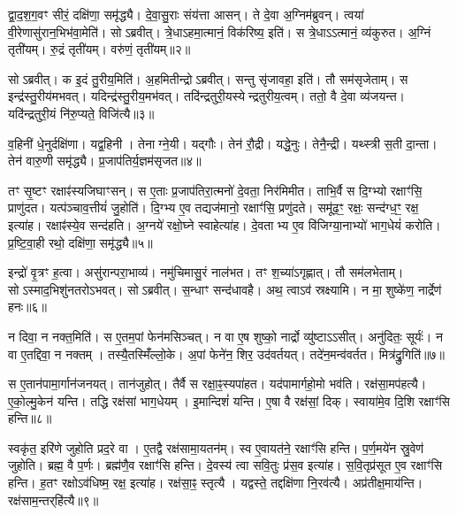 द्वा॒द॒श॒ग॒वꣳ सीरं॒ दक्षि॑णा॒ समृ॑द्ध्यै।
दे॒वा॒सु॒राः संय॑त्ता आसन्।
ते दे॒वा अ॒ग्निम॑ब्रुवन्।
त्वया॑ वी॒रेणासु॑रान॒भिभ॑वा॒मेति॑।
सोऽब्रवीत्।
त्रे॒धा\-ऽहमा॒त्मानं॒ विक॑रिष्य॒ इति॑।
स त्रे॒धा\-ऽऽत्मानं॒ व्य॑कुरुत।
अ॒ग्निं तृती॑यम्।
रु॒द्रं तृती॑यम्।
वरु॑णं॒ तृती॑यम्॥२॥

सोऽब्रवीत्।
क इ॒दं तु॒रीय॒मिति॑।
अ॒हमितीन्द्रो\-ऽब्रवीत्।
सन्तु सृ॑जावहा॒ इति॑।
तौ सम॑सृजेताम्।
स इन्द्र॑स्तु॒रीय॑मभवत्।
यदिन्द्र॑स्तु॒रीय॒मभ॑वत्।
तदि॑न्द्रतुरी॒यस्येन्द्रतुरीय॒त्वम्।
ततो॒ वै दे॒वा व्य॑जयन्त।
यदि॑न्द्रतुरी॒यं नि॑रु॒प्यते॒ विजि॑त्यै॥३॥

व॒हिनी॑ धे॒नुर्दक्षि॑णा।
यद्व॒हिनी।
तेनाग्ने॒यी।
यद्गौः।
तेन॑ रौ॒द्री।
यद्धे॒नुः।
तेनै॒न्द्री।
यथ्स्त्री स॒ती दा॒न्ता।
तेन॑ वारु॒णी समृ॑द्ध्यै।
प्र॒जाप॑तिर्य॒ज्ञम॑सृजत॥४॥

तꣳ सृ॒ष्टꣳ रक्षाꣴ॑स्यजिघाꣳसन्।
स ए॒ताः प्र॒जाप॑तिरा॒त्मनो॑ दे॒वता॒ निर॑मिमीत।
ताभि॒र्वै स दि॒ग्भ्यो रक्षाꣳ॑सि॒ प्राणु॑दत।
यत्प॑ञ्चाव॒त्तीयं॑ जु॒होति॑।
दि॒ग्भ्य ए॒व तद्यज॑मानो॒ रक्षाꣳ॑सि॒ प्रणु॑दते।
समू॑ढ॒ꣳ॒ रक्षः॒ सन्द॑ग्ध॒ꣳ॒ रक्ष॒ इत्या॑ह।
रक्षाꣴ॑स्ये॒व सन्द॑हति।
अ॒ग्नये॑ रक्षो॒घ्ने स्वाहेत्या॑ह।
दे॒वताभ्य ए॒व वि॑जिग्या॒नाभ्यो॑ भाग॒धेयं॑ करोति।
प्र॒ष्टि॒वा॒ही रथो॒ दक्षि॑णा॒ समृ॑द्ध्यै॥५॥

इन्द्रो॑ वृ॒त्रꣳ ह॒त्वा।
असु॑रान्परा॒भाव्य॑।
नमु॑चिमासु॒रं नाल॑भत।
तꣳ श॒च्या॑\-ऽगृह्णात्।
तौ सम॑लभेताम्।
सोऽस्माद॒भिशु॑नतरो\-ऽभवत्।
सोऽब्रवीत्।
स॒न्धाꣳ सन्द॑धावहै।
अथ॒ त्वाऽव॑ स्रक्ष्यामि।
न मा॒ शुष्के॑ण॒ नार्द्रेण॑ हनः॥६॥

न दिवा॒ न नक्त॒मिति॑।
स ए॒तम॒पां फेन॑मसिञ्चत्।
न वा ए॒ष शुष्को॒ नार्द्रो व्यु॑ष्टा\-ऽऽसीत्।
अनु॑दितः॒ सूर्यः॑।
न वा ए॒तद्दिवा॒ न नक्तम्।
तस्यै॒तस्मिँ॑ल्लो॒के।
अ॒पां फेने॑न॒ शिर॒ उद॑वर्तयत्।
तदे॑न॒मन्व॑वर्तत।
मित्र॑द्रु॒गिति॑॥७॥

स ए॒तान॑पामा॒र्गान॑जनयत्।
तान॑जुहोत्।
तैर्वै स रक्षा॒ꣴ॒स्यपा॑हत।
यद॑पामार्गहो॒मो भव॑ति।
रक्ष॑सा॒मप॑हत्यै।
ए॒को॒ल्मु॒केन॑ यन्ति।
तद्धि रक्ष॑सां भाग॒धेयम्।
इ॒मान्दिशं॑ यन्ति।
ए॒षा वै रक्ष॑सां॒ दिक्।
स्वाया॑मे॒व दि॒शि रक्षाꣳ॑सि हन्ति॥८॥

स्वकृ॑त॒ इरि॑णे जुहोति प्रद॒रे वा।
ए॒तद्वै रक्ष॑सामा॒यतन॑म्।
स्व ए॒वायत॑ने॒ रक्षाꣳ॑सि हन्ति।
प॒र्ण॒मये॑न स्रु॒वेण॑ जुहोति।
ब्रह्म॒ वै प॒र्णः।
ब्रह्म॑णै॒व रक्षाꣳ॑सि हन्ति।
दे॒वस्य॑ त्वा सवि॒तुः प्र॑स॒व इत्या॑ह।
स॒वि॒तृप्र॑सूत ए॒व रक्षाꣳ॑सि हन्ति।
ह॒तꣳ रक्षो\-ऽव॑धिष्म॒ रक्ष॒ इत्या॑ह।
रक्ष॑सा॒ꣴ॒ स्तृत्यै।
यद्वस्ते॒ तद्दक्षि॑णा नि॒रव॑त्यै।
अप्र॑तीक्ष॒माय॑न्ति।
रक्ष॑साम॒न्तर्‌\mbox{}हि॑त्यै॥९॥\anuvakamend[य॒च्छ॒ति॒ वरु॑णं॒ तृती॑यं॒ विजि॑त्या असृजत॒ समृ॑द्ध्यै हनो॒ मित्र॑द्रु॒गिति॑ हन्ति॒ स्तृत्यै॒ त्रीणि॑ च]

